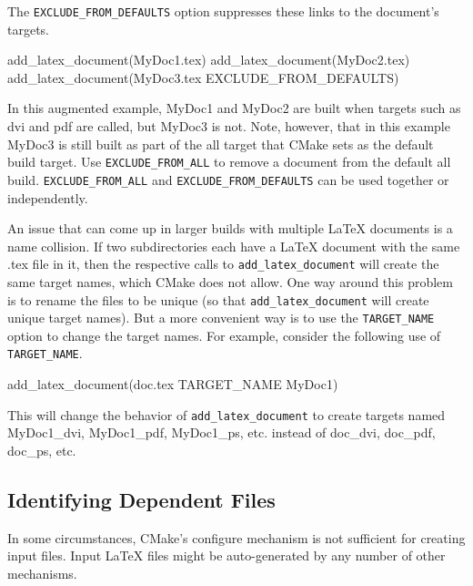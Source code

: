 \documentclass{article}
\newcommand*{\textfile}[1]{\textsf{#1}}
\newcommand*{\textcmake}[1]{\texttt{#1}}
\newcommand*{\textmaketarget}[1]{#1}
\newcommand*{\latex}{\LaTeX\xspace}
\newcommand*{\ald}{\textcmake{add\_latex\_document}\xspace}
\begin{document}
  The \textcmake{EXCLUDE\_FROM\_DEFAULTS} option suppresses these links to the
  document's targets.

  \begin{CodeListing}
add_latex_document(MyDoc1.tex)
add_latex_document(MyDoc2.tex)
add_latex_document(MyDoc3.tex EXCLUDE_FROM_DEFAULTS)
  \end{CodeListing}

  In this augmented example, MyDoc1 and MyDoc2 are built when targets such
  as \textmaketarget{dvi} and \textmaketarget{pdf} are called, but MyDoc3
  is not. Note, however, that in this example MyDoc3 is still built as part
  of the \textmaketarget{all} target that CMake sets as the default build
  target. Use \textcmake{EXCLUDE\_FROM\_ALL} to remove a document from the
  default \textmaketarget{all} build. \textcmake{EXCLUDE\_FROM\_ALL} and
  \textcmake{EXCLUDE\_FROM\_DEFAULTS} can be used together or
  independently.

  An issue that can come up in larger builds with multiple \latex documents
  is a name collision. If two subdirectories each have a \latex document
  with the same \textfile{.tex} file in it, then the respective calls to
  \ald will create the same target names, which CMake does not allow. One
  way around this problem is to rename the files to be unique (so that \ald
  will create unique target names). But a more convenient way is to use the
  \textcmake{TARGET\_NAME} option to change the target names. For example,
  consider the following use of \textcmake{TARGET\_NAME}.

  \begin{CodeListing}
add_latex_document(doc.tex TARGET_NAME MyDoc1)
  \end{CodeListing}

  This will change the behavior of \ald to create targets named
  \textmaketarget{MyDoc1\_dvi}, \textmaketarget{MyDoc1\_pdf},
  \textmaketarget{MyDoc1\_ps}, etc. instead of \textmaketarget{doc\_dvi},
  \textmaketarget{doc\_pdf}, \textmaketarget{doc\_ps}, etc.

  \subsection{Identifying Dependent Files}
  \label{sec:IdentifyingDependentFiles}

  In some circumstances, CMake's configure mechanism is not sufficient for
  creating input files.  Input \latex files might be auto-generated by any
  number of other mechanisms.
\end{document}
